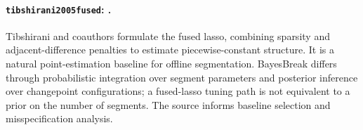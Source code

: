 \paragraph{\texttt{tibshirani2005fused}: \citet{tibshirani2005fused}.}
Tibshirani and coauthors formulate the fused lasso, combining sparsity and adjacent-difference penalties to estimate piecewise-constant structure. It is a natural point-estimation baseline for offline segmentation. BayesBreak differs through probabilistic integration over segment parameters and posterior inference over changepoint configurations; a fused-lasso tuning path is not equivalent to a prior on the number of segments. The source informs baseline selection and misspecification analysis.
